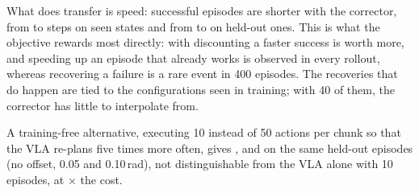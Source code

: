 What does transfer is speed: successful episodes are shorter with the corrector, from \RLStepsSeenVla{} to
\RLStepsSeenRes{} steps on seen states and from \RLStepsUnseenVla{} to \RLStepsUnseenRes{} on held-out
ones. This is what the objective rewards most directly: with discounting a faster success is worth more,
and speeding up an episode that already works is observed in every rollout, whereas recovering a failure
is a rare event in 400 episodes. The recoveries that do happen are tied to the configurations seen in
training; with 40 of them, the corrector has little to interpolate from.

A training-free alternative, executing 10 instead of 50 actions per chunk so that the VLA re-plans five
times more often, gives \RLReplanClean{}, \RLReplanTrain{} and \RLReplanStrong{} on the same held-out
episodes (no offset, 0.05 and 0.10\,rad), not distinguishable from the VLA alone with 10 episodes, at
\RLReplanSlowdown{}$\times$ the cost.
